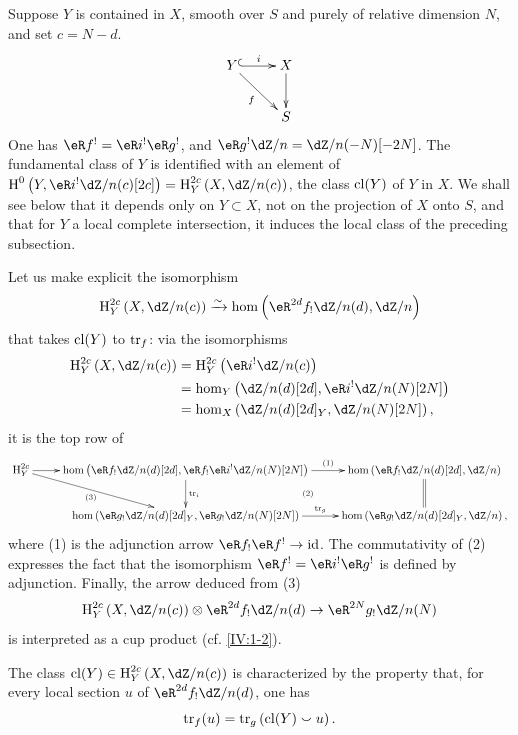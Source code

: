 Suppose $Y$ is contained in $X$, smooth over $S$ and purely of relative
dimension $N$, and set $c=N-d$.
\[\xymatrix{
  Y \ar@{^{(}->}[r]^-i \ar[dr]_-f
    & X \ar[d] \\
  & S
}\]
One has $\eR f^! = \eR i^!\eR g^!$, and
$\eR g^! \dZ/n=\dZ/n(-N)[-2 N]$. The fundamental class of $Y$ is identified
with an element of
$\h^0\left(Y,\eR i^!\dZ/n(c)[2 c]\right)=\h_Y^{2 c}\left(X,\dZ/n(c)\right)$,
the class $\operatorname{cl}(Y)$ of $Y$ in $X$. We shall see below that it depends only on
$Y\subset X$, not on the projection of $X$ onto $S$, and that for $Y$ a local
complete intersection, it induces the local class of the preceding
subsection.

Let us make explicit the isomorphism
\[
  \h_Y^{2 c}\left(X,\dZ/n(c)\right) \iso \hom\left(\eR^{2 d}f_!\dZ/n(d),\dZ/n\right)
\]
that takes $\operatorname{cl}(Y)$ to $\operatorname{tr}_f$: via the isomorphisms
\begin{align*}
  \h_Y^{2 c}\left(X,\dZ/n(c)\right)
    &= \h_Y^{2 c}\left(\eR i^!\dZ/n(c)\right) \\
    &= \hom_Y\left(\dZ/n(d)[2 d],\eR i^!\dZ/n(N)[2 N]\right) \\
    &= \hom_X\left(\dZ/n(d)[2 d]_Y,\dZ/n(N)[2 N]\right) \text{,}
\end{align*}
it is the top row of
\[\xymatrix{
  \h_Y^{2 c} \ar[r] \ar[dr]_-{(3)}
    & \hom\left(\eR f_!\dZ/n(d)[2 d],\eR f_! \eR i^!\dZ/n(N)[2 N]\right) \ar[r]^-{(1)} \ar[d]^-{\tr_i} \ar@{}[dr]|-{(2)}
    & \hom\left(\eR f_!\dZ/n(d)[2d],\dZ/n\right) \ar@{=}[d] \\
  & \hom\left(\eR g_!\dZ/n(d)[2 d]_Y,\eR g_!\dZ/n(N)[2 N]\right) \ar[r]^-{\tr_g}
    & \hom\left(\eR g_!\dZ/n(d)[2 d]_Y,\dZ/n\right) \text{,}
}\]
where (1) is the adjunction arrow $\eR f_!\eR f^!\to \text{id}$. The
commutativity of (2) expresses the fact that the isomorphism
$\eR f^!=\eR i^!\eR g^!$ is defined by adjunction. Finally, the arrow
deduced from (3)
\[
  \h_Y^{2c}\left(X,\dZ/n(c)\right) \otimes \eR^{2 d} f_!\dZ/n(d) \to \eR^{2 N} g_!\dZ/n(N)
\]
is interpreted as a cup product (cf. \ref{IV:1-2}).






\begin{definition}\label{IV:2-3-2}
The class $\cl(Y)\in\h_Y^{2 c}\left(X,\dZ/n(c)\right)$ is characterized by
the property that, for every local section $u$ of
$\eR^{2 d}f_! \dZ/n(d)$, one has
\[
  \operatorname{tr}_f(u) = \operatorname{tr}_g\left(\operatorname{cl}(Y)\smallsmile u\right) \text{.}
\]
\end{definition}

